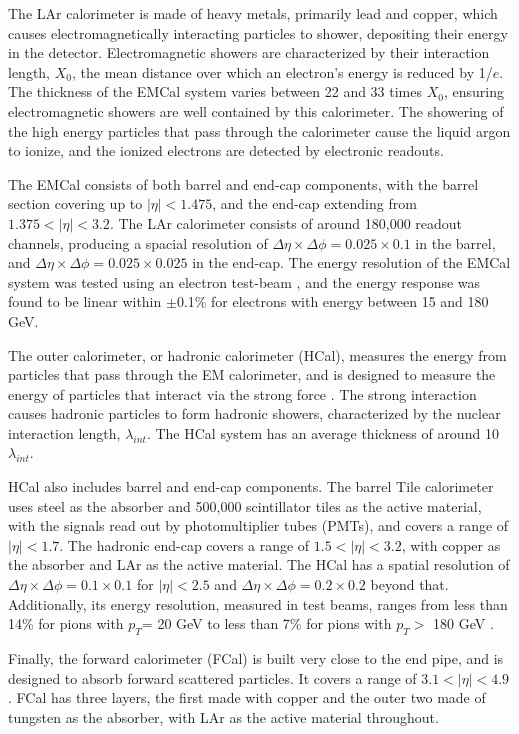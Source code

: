 The LAr calorimeter is made of heavy metals, primarily lead and copper, which causes electromagnetically interacting particles to shower, depositing their energy in the detector. Electromagnetic showers are characterized by their interaction length, $X_0$, the mean distance over which an electron's energy is reduced by 1/$e$. The thickness of the EMCal system varies between 22 and 33 times $X_0$, ensuring electromagnetic showers are well contained by this calorimeter. The showering of the high energy particles that pass through the calorimeter cause the liquid argon to ionize, and the ionized electrons are detected by electronic readouts. 

The EMCal consists of both barrel and end-cap components, with the barrel section covering up to $|\eta|<1.475$, and the end-cap extending from $1.375<|\eta|<3.2$. The LAr calorimeter consists of around 180,000 readout channels, producing a spacial resolution of $\Delta\eta\times\Delta\phi = 0.025\times 0.1$ in the barrel, and $\Delta\eta\times\Delta\phi = 0.025\times 0.025$ in the end-cap. The energy resolution of the EMCal system was tested using an electron test-beam \cite{Aharrouche_2006}, and the energy response was found to be linear within $\pm$0.1\% for electrons with energy between 15 and 180 GeV. 

The outer calorimeter, or hadronic calorimeter (HCal), measures the energy from particles that pass through the EM calorimeter, and is designed to measure the energy of particles that interact via the strong force \cite{TCAL-2010-01}. The strong interaction causes hadronic particles to form hadronic showers, characterized by the nuclear interaction length, $\lambda_{int}$.
The HCal system has an average thickness of around 10 $\lambda_{int}$.
 
HCal also includes barrel and end-cap components. The barrel Tile calorimeter uses steel as the absorber and 500,000 scintillator tiles as the active material, with the signals read out by photomultiplier tubes (PMTs), and covers a range of $|\eta|<1.7$. The hadronic end-cap covers a range of $1.5<|\eta|<3.2$, with copper as the absorber and LAr as the active material. The HCal has a spatial resolution of $\Delta\eta\times\Delta\phi = 0.1\times 0.1$ for $|\eta|<2.5$ and $\Delta\eta\times\Delta\phi = 0.2\times 0.2$ beyond that. Additionally, its energy resolution, measured in test beams, ranges from less than 14\% for pions with $p_T$= 20 GeV to less than 7\% for pions with $p_T>$ 180 GeV \cite{Boumediene:2020cvu}.

Finally, the forward calorimeter (FCal) is built very close to the end pipe, and is designed to absorb forward scattered particles. It covers a range of $3.1<|\eta|<4.9$. FCal has three layers, the first made with copper and the outer two made of tungsten as the absorber, with LAr as the active material throughout. 

